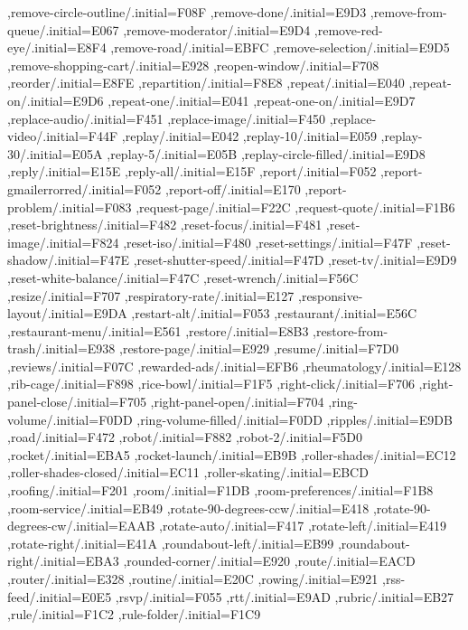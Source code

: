 { ,remove-circle-outline/.initial=F08F
 ,remove-done/.initial=E9D3
 ,remove-from-queue/.initial=E067
 ,remove-moderator/.initial=E9D4
 ,remove-red-eye/.initial=E8F4
 ,remove-road/.initial=EBFC
 ,remove-selection/.initial=E9D5
 ,remove-shopping-cart/.initial=E928
 ,reopen-window/.initial=F708
 ,reorder/.initial=E8FE
 ,repartition/.initial=F8E8
 ,repeat/.initial=E040
 ,repeat-on/.initial=E9D6
 ,repeat-one/.initial=E041
 ,repeat-one-on/.initial=E9D7
 ,replace-audio/.initial=F451
 ,replace-image/.initial=F450
 ,replace-video/.initial=F44F
 ,replay/.initial=E042
 ,replay-10/.initial=E059
 ,replay-30/.initial=E05A
 ,replay-5/.initial=E05B
 ,replay-circle-filled/.initial=E9D8
 ,reply/.initial=E15E
 ,reply-all/.initial=E15F
 ,report/.initial=F052
 ,report-gmailerrorred/.initial=F052
 ,report-off/.initial=E170
 ,report-problem/.initial=F083
 ,request-page/.initial=F22C
 ,request-quote/.initial=F1B6
 ,reset-brightness/.initial=F482
 ,reset-focus/.initial=F481
 ,reset-image/.initial=F824
 ,reset-iso/.initial=F480
 ,reset-settings/.initial=F47F
 ,reset-shadow/.initial=F47E
 ,reset-shutter-speed/.initial=F47D
 ,reset-tv/.initial=E9D9
 ,reset-white-balance/.initial=F47C
 ,reset-wrench/.initial=F56C
 ,resize/.initial=F707
 ,respiratory-rate/.initial=E127
 ,responsive-layout/.initial=E9DA
 ,restart-alt/.initial=F053
 ,restaurant/.initial=E56C
 ,restaurant-menu/.initial=E561
 ,restore/.initial=E8B3
 ,restore-from-trash/.initial=E938
 ,restore-page/.initial=E929
 ,resume/.initial=F7D0
 ,reviews/.initial=F07C
 ,rewarded-ads/.initial=EFB6
 ,rheumatology/.initial=E128
 ,rib-cage/.initial=F898
 ,rice-bowl/.initial=F1F5
 ,right-click/.initial=F706
 ,right-panel-close/.initial=F705
 ,right-panel-open/.initial=F704
 ,ring-volume/.initial=F0DD
 ,ring-volume-filled/.initial=F0DD
 ,ripples/.initial=E9DB
 ,road/.initial=F472
 ,robot/.initial=F882
 ,robot-2/.initial=F5D0
 ,rocket/.initial=EBA5
 ,rocket-launch/.initial=EB9B
 ,roller-shades/.initial=EC12
 ,roller-shades-closed/.initial=EC11
 ,roller-skating/.initial=EBCD
 ,roofing/.initial=F201
 ,room/.initial=F1DB
 ,room-preferences/.initial=F1B8
 ,room-service/.initial=EB49
 ,rotate-90-degrees-ccw/.initial=E418
 ,rotate-90-degrees-cw/.initial=EAAB
 ,rotate-auto/.initial=F417
 ,rotate-left/.initial=E419
 ,rotate-right/.initial=E41A
 ,roundabout-left/.initial=EB99
 ,roundabout-right/.initial=EBA3
 ,rounded-corner/.initial=E920
 ,route/.initial=EACD
 ,router/.initial=E328
 ,routine/.initial=E20C
 ,rowing/.initial=E921
 ,rss-feed/.initial=E0E5
 ,rsvp/.initial=F055
 ,rtt/.initial=E9AD
 ,rubric/.initial=EB27
 ,rule/.initial=F1C2
 ,rule-folder/.initial=F1C9
}
